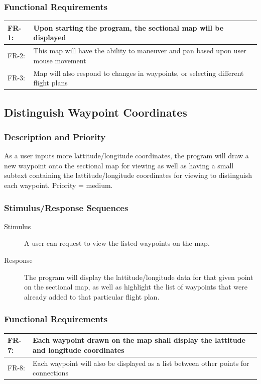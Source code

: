 \documentclass[12pt, letterpaper]{article}
\begin{document}
    \subsubsection{Functional Requirements}
    \begin{tabularx}{\textwidth}{|l|X|} \hline
      FR-1: & Upon starting the program, the sectional map will be displayed\\ \hline
      FR-2: & This map will have the ability to maneuver and pan based upon user mouse movement\\ \hline
      FR-3: & Map will also respond to changes in waypoints, or selecting different flight plans\\ \hline
      \end{tabularx}



    \subsection{Distinguish Waypoint Coordinates}
      \subsubsection{Description and Priority}
		As a user inputs more lattitude/longitude coordinates, the program will
	    draw a new waypoint onto the sectional map for viewing as well
		as having a small subtext containing the lattitude/longitude coordinates
		for viewing to distinguish each waypoint. Priority = medium.
      \subsubsection{Stimulus/Response Sequences}
        \begin{description}
          \item[Stimulus] A user can request to view the listed waypoints on the map.
		  \item[Response] The program will display the lattitude/longitude data
			for that given point on the sectional map, as well as highlight the
			list of waypoints that were already added to that particular flight
			plan.
        \end{description}
      \subsubsection{Functional Requirements}
      \begin{tabularx}{\textwidth}{|l|X|} \hline
        FR-7: & Each waypoint drawn on the map shall display the lattitude and longitude coordinates\\ \hline
        FR-8: & Each waypoint will also be displayed as a list between other points for connections\\ \hline
        \end{tabularx}
\end{document}
